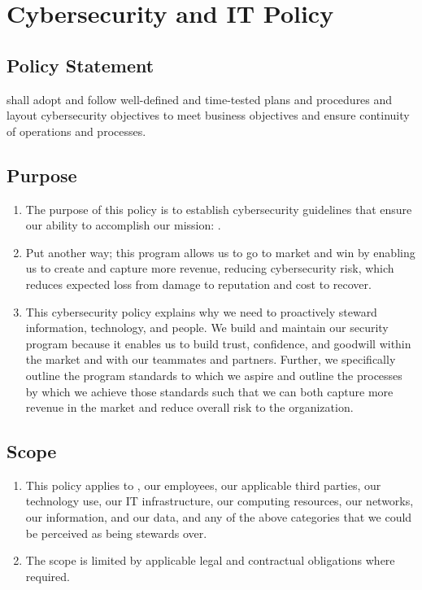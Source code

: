 \documentclass[../main.tex]{subfiles}
\begin{document}
\section{Cybersecurity and IT Policy}
  \subsection {Policy Statement}
   \CompanyName shall adopt and follow well-defined and time-tested plans and procedures and layout cybersecurity objectives to meet business objectives and ensure continuity of
   operations and processes.
  \subsection{Purpose}
  \begin{enumerate}
    \item The purpose of this policy is to establish cybersecurity guidelines that ensure our ability to accomplish our mission: \MissionStatement.
    \item Put another way; this program allows us to go to market and win by enabling us to create and capture more revenue, reducing cybersecurity risk, which reduces expected
    loss from damage to reputation and cost to recover.
    \item This cybersecurity policy explains why we need to proactively steward information, technology, and people. We build and maintain our security program because it enables us to
    build trust, confidence, and goodwill within the market and with our teammates and partners. Further, we specifically outline the program standards to which we aspire and outline
    the processes by which we achieve those standards such that we can both capture more revenue in the market and reduce overall risk to the organization.
  \end{enumerate}
  \subsection{Scope}
  \begin{enumerate}
      \item This policy applies to \CompanyName, our employees, our applicable third parties, our technology use, our IT infrastructure, our computing resources, our networks, our information,
      and our data, and any of the above categories that we could be perceived as being stewards over.
      \item The scope is limited by applicable legal and contractual obligations where required.
  \end{enumerate}
\end{document}
